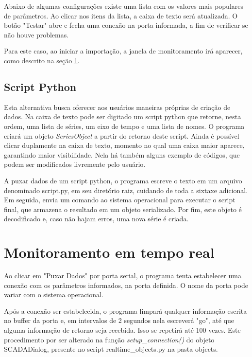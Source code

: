 Abaixo de algumas configurações existe uma lista com os valores mais populares de parâmetros. Ao clicar nos itens da lista, a caixa de texto será atualizada. O botão "Testar" abre e fecha uma conexão na porta informada, a fim de verificar se não houve problemas.

Para este caso, ao iniciar a importação, a janela de monitoramento irá aparecer, como descrito na seção \ref{monitoramento_tempo_real}.

\subsection{Script Python}

Esta alternativa busca oferecer aos usuários maneiras próprias de criação de dados. Na caixa de texto pode ser digitado um script python que retorne, nesta ordem, uma lista de séries, um eixo de tempo e uma lista de nomes. O programa criará um objeto \emph{SeriesObject} a partir do retorno deste script. Ainda é possível clicar duplamente na caixa de texto, momento no qual uma caixa maior aparece, garantindo maior visibilidade. Nela há também alguns exemplo de códigos, que podem ser modificados livremente pelo usuário.

A puxar dados de um script python, o programa escreve o texto em um arquivo denominado script.py, em seu diretório raiz, cuidando de toda a sixtaxe adicional. Em seguida, envia um comando ao sistema operacional para executar o script final, que armazena o resultado em um objeto serializado. Por fim, este objeto é decodificado e, caso não hajam erros, uma nova série é criada.

\section{Monitoramento em tempo real}\label{monitoramento_tempo_real}

Ao clicar em "Puxar Dados" por porta serial, o programa tenta estabelecer uma conexão com os parâmetros informados, na porta definida. O nome da porta pode variar com o sistema operacional.

Após a conexão ser estabelecida, o programa limpará qualquer informação escrita no buffer da porta e, em intervalos de 2 segundos nela escreverá "go", até que alguma informação de retorno seja recebida. Isso se repetirá até 100 vezes. Este procedimento por ser alterado na função \emph{setup\_connection()} do objeto SCADADialog, presente no script realtime\_objects.py na pasta objects.

